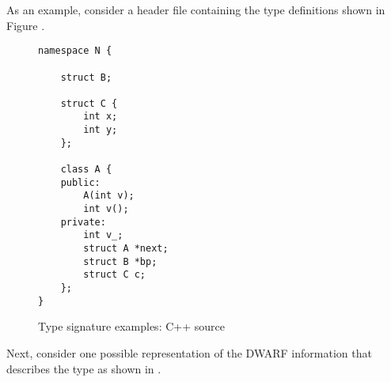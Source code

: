 As an example, 
consider a  header file 
containing the type definitions shown
in Figure .

\begin{figure}[h]
\begin{lstlisting}
namespace N {

    struct B;

    struct C {
        int x;
        int y;
    };

    class A {
    public:
        A(int v);
        int v();
    private:
        int v_;
        struct A *next;
        struct B *bp;
        struct C c;
    };
}
\end{lstlisting}
\caption{Type signature examples: C++ source}
\label{fig:typesignatureexamplescsource}
\end{figure}

Next, consider one possible representation of the DWARF
information that describes the type  as shown
in 
.

